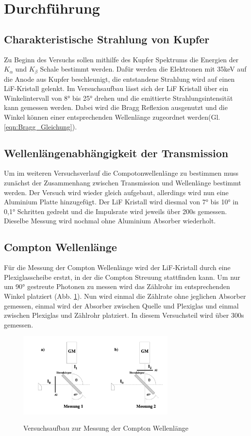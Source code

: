 \section{Durchführung}
\label{sec:Durchfuehrung}
\subsection{Charakteristische Strahlung von Kupfer}
Zu Beginn des Versuchs sollen mithilfe des Kupfer Spektrums die Energien der $K_{\alpha}$ und $K_{\beta}$ Schale bestimmt werden.
Dafür werden die Elektronen mit 35keV auf die Anode aus Kupfer beschleunigt, die entstandene Strahlung wird auf einen LiF-Kristall gelenkt.
Im Versuchsaufbau lässt sich der LiF Kristall über ein Winkelintervall von 8° bis 25° drehen und die emittierte Strahlungsintensität kann gemessen werden.
Dabei wird die Bragg Reflexion ausgenutzt und die Winkel können einer entsprechenden Wellenlänge zugeordnet werden(Gl. \ref{eqn:Bragg_Gleichung}).

\subsection{Wellenlängenabhängigkeit der Transmission}
Um im weiteren Versuchsverlauf die Compotonwellenlänge zu bestimmen muss zunächst der Zusammenhang zwischen Transmission und Wellenlänge bestimmt werden.
Der Versuch wird wieder gleich aufgebaut, allerdings wird nun eine Aluminium Platte hinzugefügt.
Der LiF Kristall wird diesmal von 7° bis 10° in 0,1° Schritten gedreht und die Impulsrate wird jeweils über 200s gemessen.
Dieselbe Messung wird nochmal ohne Aluminium Absorber wiederholt.

\subsection{Compton Wellenlänge}
Für die Messung der Compton Wellenlänge wird der LiF-Kristall durch eine Plexiglasscheibe erstzt, in der die Compton Streuung stattfinden kann. Um nur um 90° gestreute Photonen zu messen wird das Zählrohr im entsprechenden Winkel platziert (Abb. \ref{fig:Exp_Aufbau_2}).
Nun wird einmal die Zählrate ohne jeglichen Absorber gemessen, einmal wird der Absorber zwischen Quelle und Plexiglas und einmal zwischen Plexiglas und Zählrohr platziert.
In diesem Versuchsteil wird über 300s gemessen.
\begin{figure}
    \centering
    \includegraphics[width=0.7\textwidth]{bilder/Exp_Aufbau_2.png}
    \label{fig:Exp_Aufbau_2}
    \caption{Versuchsaufbau zur Messung der Compton Wellenlänge}
\end{figure}
